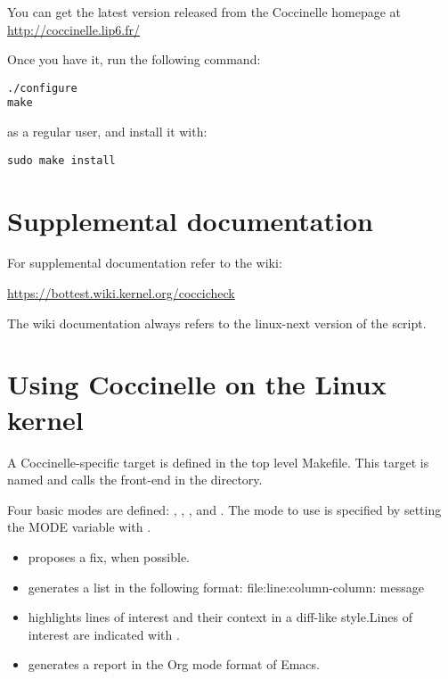 \documentclass[a4paper,8pt,english]{sphinxmanual}
\begin{document}
You can get the latest version released from the Coccinelle homepage at
\href{http://coccinelle.lip6.fr/}{http://coccinelle.lip6.fr/}

Once you have it, run the following command:

\begin{Verbatim}[commandchars=\\\{\}]
./configure
make
\end{Verbatim}

as a regular user, and install it with:

\begin{Verbatim}[commandchars=\\\{\}]
sudo make install
\end{Verbatim}


\section{Supplemental documentation}
\label{dev-tools/coccinelle:supplemental-documentation}
For supplemental documentation refer to the wiki:

\href{https://bottest.wiki.kernel.org/coccicheck}{https://bottest.wiki.kernel.org/coccicheck}

The wiki documentation always refers to the linux-next version of the script.


\section{Using Coccinelle on the Linux kernel}
\label{dev-tools/coccinelle:using-coccinelle-on-the-linux-kernel}
A Coccinelle-specific target is defined in the top level
Makefile. This target is named  and calls the 
front-end in the  directory.

Four basic modes are defined: , , , and
. The mode to use is specified by setting the MODE variable with
.
\begin{itemize}
\item {} 
 proposes a fix, when possible.

\item {} 
 generates a list in the following format:
file:line:column-column: message

\item {} 
 highlights lines of interest and their context in a
diff-like style.Lines of interest are indicated with \code{-}.

\item {} 
 generates a report in the Org mode format of Emacs.

\end{itemize}
\end{document}
